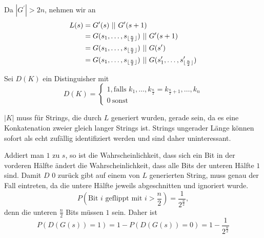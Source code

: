 \documentclass{../crypto}
\begin{document}

Da $|G^\prime| > 2n$, nehmen wir an 
\begin{align*}
   L(s) & = G^\prime(s) ~||~ G^\prime(s+1)  \\
        & = G(s_1,\ldots,s_{\lfloor\frac{n}{2}\rfloor}) ~||~ G^\prime(s+1) \\
        & = G(s_1,\ldots,s_{\lfloor\frac{n}{2}\rfloor}) ~||~ G(s^\prime) \\
        & = G(s_1,\ldots,s_{\lfloor\frac{n}{2}\rfloor}) ~||~ G(s^\prime_1,\ldots,s^\prime_{\lfloor\frac{n}{2}\rfloor}) \\
\end{align*}

Sei $D(K)$ ein Distinguisher mit 
\begin{equation*}
   D(K) = 
   \begin{cases}
      1, \text{falls $k_1,\ldots,k_{\frac{n}{2}} = k_{\frac{n}{2} + 1},\ldots,k_n$} \\
      0\ \text{sonst}
   \end{cases}
\end{equation*}

$|K|$ muss für Strings, die durch $L$ generiert wurden, gerade sein, da es
eine Konkatenation zweier gleich langer Strings ist. Strings ungerader Länge
können sofort als echt zufällig identifiziert werden und sind daher
uninteressant.

Addiert man $1$ zu $s$, so ist die Wahrscheinlichkeit, dass sich ein Bit in der
vorderen Hälfte ändert die Wahrscheinlichkeit, dass alle Bits der unteren Hälfte
$1$ sind. Damit $D$ $0$ zurück gibt auf einem von $L$ generierten String, muss
genau der Fall eintreten, da die untere Hälfte jeweils abgeschnitten und
ignoriert wurde.
\begin{equation*}
   P(\text{Bit $i$ geflippt mit $i>\frac{n}{2}$}) = \frac{1}{2^{\frac{n}{2}}},
\end{equation*}
denn die unteren $\frac{n}{2}$ Bits müssen $1$ sein.
Daher ist 
\begin{equation*}
   P(D(G(s)) = 1) = 1 - P(D(G(s)) = 0) = 1 - \frac{1}{2^\frac{n}{2}}
\end{equation*}
\end{document}
